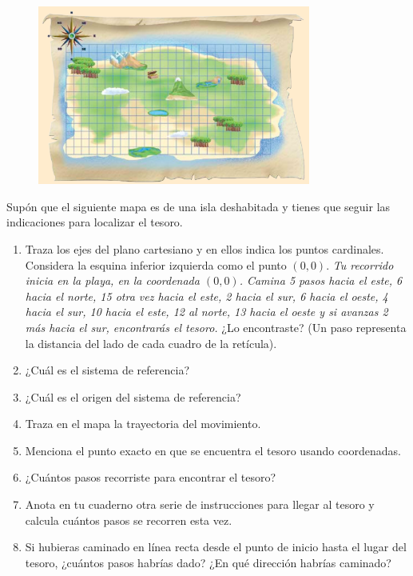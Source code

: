 \documentclass[11pt]{book}
\begin{document}
\begin{figure}[H]
    \centering
    \includegraphics[width=0.8\textwidth]{plano02.png}
    \label{fig:plano02}
\end{figure}
Supón que el siguiente mapa es de una isla deshabitada y tienes que seguir las indicaciones
para localizar el tesoro.
\begin{enumerate}
    \item Traza los ejes del plano cartesiano y en ellos indica los puntos cardinales.
          Considera la esquina inferior izquierda como el punto $(0, 0)$.
          \emph{Tu recorrido inicia en la playa, en la coordenada $(0, 0)$.
              Camina 5 pasos hacia el este, 6 hacia el norte, 15 otra vez hacia el este, 2 hacia el sur,
              6 hacia el oeste, 4 hacia el sur, 10 hacia el este, 12 al norte, 13 hacia el oeste y
              si avanzas 2 más hacia el sur, encontrarás el tesoro.} ¿Lo encontraste?
          (Un paso representa la distancia del lado de cada cuadro de la retícula).
    \item ¿Cuál es el sistema de referencia?
    \item ¿Cuál es el origen del sistema de referencia?
    \item Traza en el mapa la trayectoria del movimiento.
    \item Menciona el punto exacto en que se encuentra el tesoro usando coordenadas.
    \item ¿Cuántos pasos recorriste para encontrar el tesoro?
    \item Anota en tu cuaderno otra serie de instrucciones para llegar al tesoro y calcula cuántos
          pasos se recorren esta vez.
    \item Si hubieras caminado en línea recta desde el punto de inicio hasta el lugar del tesoro,
          ¿cuántos pasos habrías dado? ¿En qué dirección habrías caminado?
\end{enumerate}
\end{document}

